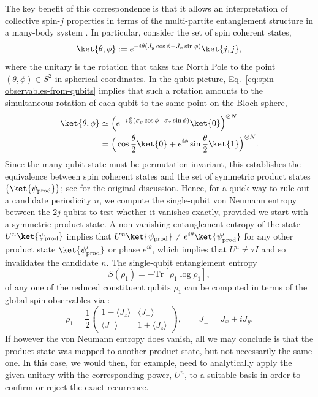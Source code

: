\documentclass[a4paper,onecolumn,accepted=2026-04-08,10pt]{quantumarticle}
\theoremstyle{definition}
\begin{document}
The key benefit of this correspondence is that it allows an interpretation of collective spin-$j$ properties in terms of the multi-partite entanglement structure in a many-body system \cite{Giraud_Tensor_PRL_2015}.  In particular, consider the set of spin coherent states,
\begin{equation}
    \ket{\theta,\phi} := e^{-i\theta(J_y \cos \phi - J_x \sin\phi)} \ket{j,j},
\end{equation}
where the unitary is the rotation that takes the North Pole to the point $(\theta,\phi) \in S^2$ in spherical coordinates.  In the qubit picture, Eq.\ \eqref{eq:spin-observables-from-qubits} implies that such a rotation amounts to the simultaneous rotation of each qubit to the same point on the Bloch sphere,
\begin{equation}
\begin{aligned}
    \ket{\theta,\phi} &\simeq \Big(e^{-i\frac{\theta}{2}(\sigma_y \cos \phi - \sigma_x \sin\phi)} \ket{0} \Big)^{\otimes N} \\
    &= \Big( \cos \frac{\theta}{2} \ket{0} + e^{i\phi} \sin \frac{\theta}{2} \ket{1} \Big)^{\otimes N}.
\end{aligned}
\end{equation}
Since the many-qubit state must be permutation-invariant, this establishes the equivalence between spin coherent states and the set of symmetric product states $\{\ket{\psi_{\text{prod}}}\}$; see \cite{Arecchi1972SCS} for the original discussion.  Hence, for a quick way to rule out a candidate periodicity $n$, we compute the single-qubit von Neumann entropy between the $2j$ qubits to test whether it vanishes exactly, provided we start with a symmetric product state. A non-vanishing entanglement entropy of the state $U^n\ket{\psi_{\text{prod}}}$ implies that $U^n\ket{\psi_{\text{prod}}} \neq e^{i\theta}\ket{\psi'_{\text{prod}}}$ for any other product state $\ket{\psi'_{\text{prod}}}$ or phase $e^{i\theta}$, which implies that $U^n \neq \tau I$ and so invalidates the candidate $n$.
The single-qubit entanglement entropy
\begin{equation}\label{eq:entanglement entropy}
S(\rho_1) = -\text{Tr}[\rho_1 \log\rho_1], 
\end{equation}
of any one of the reduced constituent qubits $\rho_1$ can be computed in terms of the global spin observables via \cite{Baguette_MM_reductions_2014}:
\begin{equation}
\label{e: one qubit density matrix}
    \rho_1 = \frac{1}{2}
    \begin{pmatrix}
    1 - \langle J_z \rangle & \langle J_- \rangle \\
    \langle J_+ \rangle & 1 + \langle J_z \rangle
    \end{pmatrix}, \qquad J_\pm = J_x \pm i J_y.
\end{equation} 
If however the von Neumann entropy does vanish, all we may conclude is that the product state was mapped to another product state, but not necessarily the same one.  In this case, we would then, for example, need to analytically apply the given unitary with the corresponding power, $U^n$, to a suitable basis in order to confirm or reject the exact recurrence.
\end{document}
